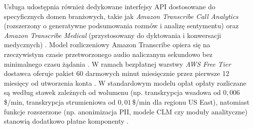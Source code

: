 Usługa udostępnia również dedykowane interfejsy API dostosowane do specyficznych domen branżowych, takie jak \textit{Amazon Transcribe Call Analytics} (rozszerzony o generatywne podsumowania rozmów i analizę sentymentu) oraz \textit{Amazon Transcribe Medical} (przystosowany do dyktowania i konwersacji medycznych) \cite{amazon_transcribe_features}. Model rozliczeniowy Amazon Transcribe opiera się na rzeczywistym czasie przetworzonego audio naliczanym sekundowo bez minimalnego czasu żądania \cite{amazon_transcribe_pricing}. W ramach bezpłatnej warstwy \textit{AWS Free Tier} dostawca oferuje pakiet 60 darmowych minut miesięcznie przez pierwsze 12 miesięcy od utworzenia konta \cite{amazon_transcribe_pricing}. W standardowym modelu opłat opłaty rozliczane są według stawek zależnych od wolumenu (np. transkrypcja wsadowa od $0{,}006$\,\$/min, transkrypcja strumieniowa od $0{,}01$\,\$/min dla regionu US East), natomiast funkcje rozszerzone (np. anonimizacja PII, modele CLM czy moduły analityczne) stanowią dodatkowo płatne komponenty \cite{amazon_transcribe_pricing}.

